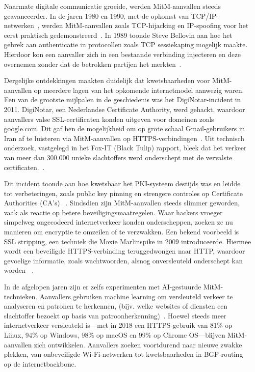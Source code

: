 Naarmate digitale communicatie groeide, werden MitM-aanvallen steeds geavanceerder. In de jaren 1980 en 1990, met de opkomst van TCP/IP-netwerken~\autocite{computerhistory1980s}, werden MitM-aanvallen zoals TCP-hijacking en IP-spoofing voor het eerst praktisch gedemonstreerd~\autocite{purdueengineering2025}. In 1989 toonde Steve Bellovin aan hoe het gebrek aan authenticatie in protocollen zoals TCP sessiekaping mogelijk maakte. Hierdoor kon een aanvaller zich in een bestaande verbinding injecteren en deze overnemen zonder dat de betrokken partijen het merkten~\autocite{Bellovin2004}.

Dergelijke ontdekkingen maakten duidelijk dat kwetsbaarheden voor MitM-aanvallen op meerdere lagen van het opkomende internetmodel aanwezig waren. Een van de grootste mijlpalen in de geschiedenis was het DigiNotar-incident in 2011. DigiNotar, een Nederlandse Certificate Authority, werd gehackt, waardoor aanvallers valse SSL-certificaten konden uitgeven voor domeinen zoals google.com. Dit gaf hen de mogelijkheid om op grote schaal Gmail-gebruikers in Iran af te luisteren via MitM-aanvallen op HTTPS-verbindingen~\autocite{onderzoeksraad2012}.
Uit technisch onderzoek, vastgelegd in het Fox-IT (Black Tulip) rapport, bleek dat het verkeer van meer dan 300.000 unieke slachtoffers werd onderschept met de vervalste certificaten.~\autocite{eff2011}.


Dit incident toonde aan hoe kwetsbaar het PKI-systeem destijds was en leidde tot verbeteringen, zoals public key pinning en strengere controles op Certificate Authorities (CA’s) ~\autocite{pkic2013}.
Sindsdien zijn MitM-aanvallen steeds slimmer geworden, vaak als reactie op betere beveiligingsmaatregelen. Waar hackers vroeger simpelweg ongecodeerd internetverkeer konden onderscheppen, zoeken ze nu manieren om encryptie te omzeilen of te verzwakken.
Een bekend voorbeeld is SSL stripping, een techniek die Moxie Marlinspike in 2009 introduceerde. Hiermee wordt een beveiligde HTTPS-verbinding teruggedwongen naar HTTP, waardoor gevoelige informatie, zoals wachtwoorden, alsnog onversleuteld onderschept kan worden ~\autocite{PMC2023}.

In de afgelopen jaren zijn er zelfs experimenten met AI-gestuurde MitM-technieken. Aanvallers gebruiken machine learning om versleuteld verkeer te analyseren en patronen te herkennen, (bijv. welke websites of diensten een slachtoffer bezoekt op basis van patroonherkenning)~\autocite{Hababi2020}.
Hoewel steeds meer internetverkeer versleuteld is—met in 2018 een HTTPS-gebruik van 81\% op Linux, 94\% op Windows, 98\% op macOS en 99\% op Chrome OS—blijven MitM-aanvallen zich ontwikkelen. Aanvallers zoeken voortdurend naar nieuwe zwakke plekken, van onbeveiligde Wi-Fi-netwerken tot kwetsbaarheden in BGP-routing op de internetbackbone. ~\autocite{google2025}

